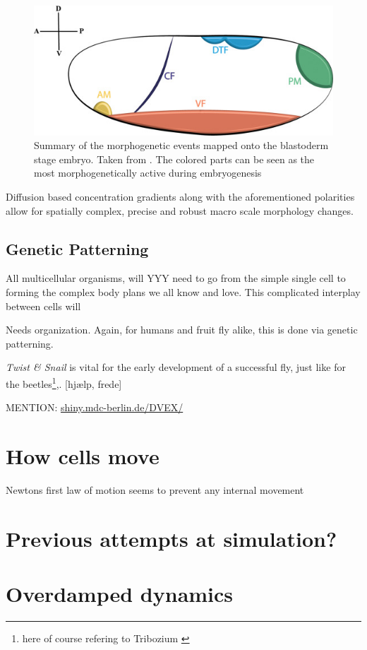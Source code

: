 \begin{figure}[H]
    \centering
    \includegraphics[width = 0.7\linewidth]{figures/morphogenic_events.jpg}
    \caption{Summary of the morphogenetic events mapped onto the blastoderm stage embryo. Taken from \cite{gheisari2020gastrulation}. The colored parts can be seen as the most morphogenetically active during embryogenesis}
    \label{fig:enter-label}
\end{figure}



Diffusion based concentration gradients along with the aforementioned polarities allow for spatially complex, precise and robust macro scale morphology changes.

\subsection{Genetic Patterning}
All multicellular organisms, will YYY need to go from the simple single cell to forming the complex body plans we all know and love. This complicated interplay between cells will 

Needs organization. Again, for humans and fruit fly alike, this is done via genetic patterning.\cite{veraksa2000developmental} 




\textit{Twist \& Snail} is vital for the early development of a successful fly, just like for the beetles\footnote{here of course refering to Tribozium \cite{sommer1994expression}},. [hjælp, frede] 

MENTION: \url{shiny.mdc-berlin.de/DVEX/}
\section{How cells move}
Newtons first law of motion seems to prevent any internal movement


\section{Previous attempts at simulation?}
\section{Overdamped dynamics}

